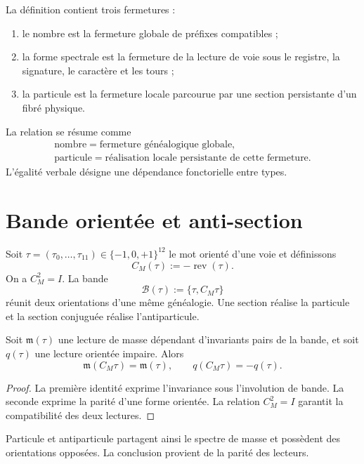 La définition contient trois fermetures :
\begin{enumerate}
\item le nombre est la fermeture globale de préfixes compatibles ;
\item la forme spectrale est la fermeture de la lecture de voie sous le registre,
      la signature, le caractère et les tours ;
\item la particule est la fermeture locale parcourue par une section persistante
      d'un fibré physique.
\end{enumerate}
La relation se résume comme
\[
 \boxed{
 \begin{gathered}
 \text{nombre}=\text{fermeture généalogique globale},
 \\
 \text{particule}=\text{réalisation locale persistante de cette fermeture}.
 \end{gathered}}
\]
L'égalité verbale désigne une dépendance fonctorielle entre types.

\section{Bande orientée et anti-section}

Soit \(\tau=(\tau_0,\ldots,\tau_{11})\in\{-1,0,+1\}^{12}\) le mot
orienté d'une voie et définissons
\begin{equation}
 C_M(\tau):=-\operatorname{rev}(\tau).
 \label{eq:conjugacion-material-bisagra}
\end{equation}
On a \(C_M^2=I\). La bande
\[
 \mathcal B(\tau):=\{\tau,C_M\tau\}
\]
réunit deux orientations d'une même généalogie. Une section réalise la
particule et la section conjuguée réalise l'antiparticule.

\begin{proposition}
\label{prop:paridad-masa-orientacion-bisagra}
Soit \(\mathfrak m(\tau)\) une lecture de masse dépendant d'invariants pairs
de la bande, et soit \(q(\tau)\) une lecture orientée impaire. Alors
\[
 \mathfrak m(C_M\tau)=\mathfrak m(\tau),
 \qquad
 q(C_M\tau)=-q(\tau).
\]
\end{proposition}

\begin{proof}
La première identité exprime l'invariance sous l'involution de bande. La
seconde exprime la parité d'une forme orientée. La relation \(C_M^2=I\)
garantit la compatibilité des deux lectures.
\end{proof}

Particule et antiparticule partagent ainsi le spectre de masse et possèdent
des orientations opposées. La conclusion provient de la parité des lecteurs.

